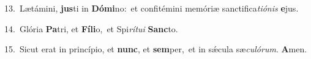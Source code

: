 {\numbfont\textcolor{\numbcolor}{13.}}~Lætámini, \textbf{jus}\-ti in \textbf{Dó}\-\textbf{mi}no:~\star et confitémini memóriæ sanctifica\-\textit{ti}\-\textit{ó}\textit{nis} \textbf{e}\-jus.\par
{\numbfont\textcolor{\numbcolor}{14.}}~Glória \textbf{Pa}\-tri, et \textbf{Fí}\-\textbf{li}o,~\star et Spi\-\textit{rí}\-\textit{tu}\textit{i} \textbf{Sanc}\-to.\par
{\numbfont\textcolor{\numbcolor}{15.}}~Sicut erat in princípio, et \textbf{nunc}\-, et \textbf{sem}\-per,~\star et in sǽcula sæ\-\textit{cu}\-\textit{ló}\textit{rum}. \textbf{A}\-men.\par
